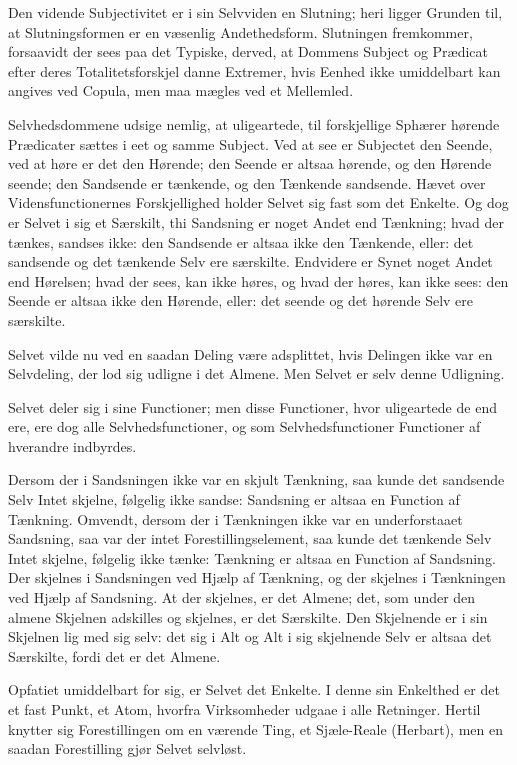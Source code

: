 \documentclass[12pt]{book}
\newcommand{\opage}[1]{\marginnote{\footnotesize\textit{[#1]}}}
\begin{document}
Den vidende Subjectivitet er i sin Selvviden en
\opage{5} Slutning; heri ligger Grunden til, at Slutningsformen er en væsenlig
Andethedsform. Slutningen fremkommer, forsaavidt der sees paa det
Typiske, derved, at Dommens Subject og Prædicat efter deres
Totalitetsforskjel danne Extremer, hvis Eenhed ikke umiddelbart kan
angives ved Copula, men maa mægles ved et Mellemled.

Selvhedsdommene udsige nemlig, at uligeartede, til forskjellige
Sphærer hørende Prædicater sættes i eet og samme Subject. Ved at see
er Subjectet den Seende, ved at høre er det den Hørende; den Seende
er altsaa hørende, og den Hørende seende; den Sandsende er tænkende,
og den Tænkende sandsende. Hævet over Vidensfunctionernes
Forskjellighed holder Selvet sig fast som det Enkelte. Og dog er
Selvet i sig et Særskilt, thi Sandsning er noget Andet end Tænkning;
hvad der tænkes, sandses ikke: den Sandsende er altsaa ikke den
Tænkende, eller: det sandsende og det tænkende Selv ere særskilte.
Endvidere er Synet noget Andet end Hørelsen; hvad der sees, kan ikke
høres, og hvad der høres, kan ikke sees: den Seende er altsaa ikke
den Hørende, eller: det seende og det hørende Selv ere særskilte.

Selvet vilde nu ved en saadan Deling være adsplittet, hvis Delingen
ikke var en Selvdeling, der lod sig udligne i det Almene. Men Selvet
er selv denne Udligning.

Selvet deler sig i sine Functioner; men disse Functioner, hvor
uligeartede de end ere, ere dog alle Selvhedsfunctioner, og som
Selvhedsfunctioner Functioner af hverandre indbyrdes.

Dersom der i Sandsningen ikke var en skjult Tænkning, saa kunde det
sandsende Selv Intet skjelne, følgelig ikke sandse: Sandsning er
altsaa en Function af Tænkning. Omvendt, dersom der i Tænkningen ikke
var en underforstaaet Sandsning, saa var der intet
Forestillingselement, saa kunde det tænkende Selv Intet skjelne,
følgelig ikke tænke: Tænkning er altsaa en Function af Sandsning. Der
skjelnes i
\opage{6} Sandsningen ved Hjælp af Tænkning, og der skjelnes i Tænkningen ved
Hjælp af Sandsning. At der skjelnes, er det Almene; det, som under
den almene Skjelnen adskilles og skjelnes, er det Særskilte. Den
Skjelnende er i sin Skjelnen lig med sig selv: det sig i Alt og Alt i
sig skjelnende Selv er altsaa det Særskilte, fordi det er det Almene.

Opfatiet umiddelbart for sig, er Selvet det Enkelte. I denne sin
Enkelthed er det et fast Punkt, et Atom, hvorfra Virksomheder udgaae
i alle Retninger. Hertil knytter sig Forestillingen om en værende
Ting, et Sjæle-Reale (Herbart), men en saadan Forestilling gjør
Selvet selvløst.
\end{document}
